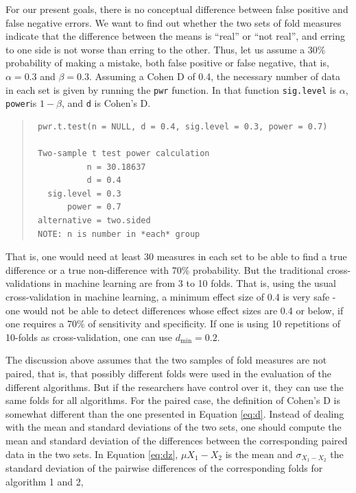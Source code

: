\documentclass[twoside,11pt,preprint]{article}
\begin{document}
For our present goals, there is no conceptual difference
between false positive and false negative errors. We want to find out
whether the two sets of fold measures indicate that the difference
between the means is ``real'' or ``not real'', and erring to one side is
not worse than erring to the other. Thus, let us assume a 30\% probability of
making a mistake, both false positive or false negative, that is, \(\alpha = 0.3\) and \(\beta = 0.3\). Assuming a Cohen D of 0.4, the necessary number of data
in each set is given by running the \texttt{pwr} function. In that function \texttt{sig.level} is \(\alpha\), \texttt{power}is \(1-\beta\), and \texttt{d} is Cohen's D.

\begin{quote}
\begin{verbatim}
 pwr.t.test(n = NULL, d = 0.4, sig.level = 0.3, power = 0.7)

 Two-sample t test power calculation 
           n = 30.18637
           d = 0.4
   sig.level = 0.3
       power = 0.7
 alternative = two.sided
 NOTE: n is number in *each* group
\end{verbatim}
\end{quote}

That is, one would need at least 30 measures in each set to be able
to find a true difference or a true non-difference with 70\%
probability. But the traditional cross-validations in machine
learning are from 3 to 10 folds. That is, using the usual cross-validation
in machine learning, a minimum effect size of 0.4 is very
safe - one would not be able to detect differences whose effect sizes
are 0.4 or below, if one requires a 70\% of sensitivity and
specificity. If one is using 10 repetitions of 10-folds as cross-validation,
one can use \(d_{\min} = 0.2\).

The discussion above assumes that the two samples of fold measures are
not paired, that is, that possibly different
folds were used in the evaluation of the different algorithms. But if
the researchers have control over it, they can use the same folds for
all algorithms. For the paired case, the definition of
Cohen's D is somewhat different than the one presented in
Equation \ref{eq:d}. Instead of dealing with the mean and standard deviations
of the two sets, one should compute the mean and standard deviation of
the differences between the corresponding paired data in the two sets. In Equation \ref{eq:dz}, \(\mu{X_1 - X_2}\) is the mean and \(\sigma_{X_1 - X_2}\) the standard deviation of the pairwise differences of the corresponding folds for algorithm 1 and 2,
\end{document}
